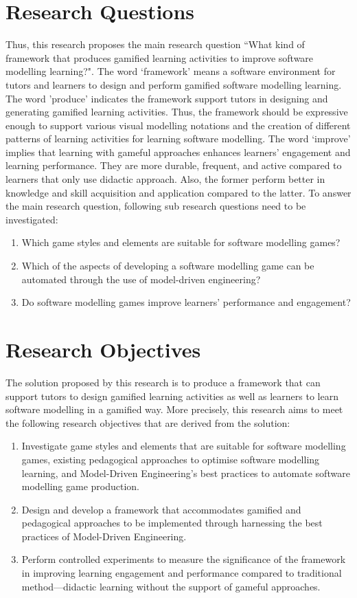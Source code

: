 \documentclass[12pt, a4paper]{report} \usepackage[titletoc]{appendix}
\begin{document}
\section{Research Questions}
Thus, this research proposes the main research question ``What kind of framework that produces gamified learning activities to improve software modelling learning?". The word `framework' means a software environment for tutors and learners to design and perform gamified software modelling learning. The word 'produce' indicates the framework support tutors in designing and generating gamified learning activities. Thus, the framework should be expressive enough to support various visual modelling notations and the creation of different patterns of learning activities for learning software modelling. The word `improve' implies that learning with gameful approaches enhances learners' engagement and learning performance. They are more durable, frequent, and active compared to learners that only use didactic approach. Also, the former perform better in knowledge and skill acquisition and application compared to the latter. To answer the main research question, following sub research questions need to be investigated:
\begin{enumerate} 
\item Which game styles and elements are suitable for software modelling games?
\item Which of the aspects of developing a software modelling game can be automated through the use of model-driven engineering?
\item Do software modelling games improve learners' performance and engagement?
\end{enumerate}

\section{Research Objectives}
The solution proposed by this research is to produce a framework that can support tutors to design gamified learning activities as well as learners to learn software modelling in a gamified way. More precisely, this research aims to meet the following research objectives that are derived from the solution:
\begin{enumerate}
\item Investigate game styles and elements that are suitable for software modelling games, existing pedagogical approaches to optimise software modelling learning, and Model-Driven Engineering's best practices to automate software modelling game production.
\item Design and develop a framework that accommodates gamified and pedagogical approaches to be implemented through harnessing the best practices of Model-Driven Engineering. 
\item Perform controlled experiments to measure the significance of the framework in improving learning engagement and performance compared to traditional method---didactic learning without the support of gameful approaches.
\end{enumerate}
\end{document}
